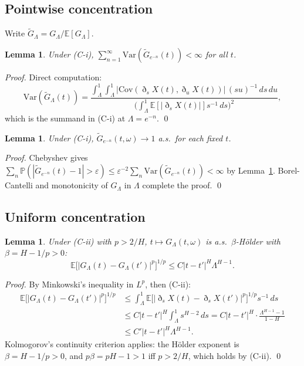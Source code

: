 \documentclass[10pt,a4paper]{amsart}
\newtheorem{lemma}[theorem]{Lemma}
\newcommand{\E}{\mathbb{E}}
\newcommand{\GL}{G_\Lambda}
\newcommand{\Gtil}{\tilde{G}_\Lambda}
\begin{document}
\subsection{Pointwise concentration}

Write $\Gtil=\GL/\E[\GL]$.

\begin{lemma}\label{lem:varsum}
Under (C-i), $\sum_{n=1}^\infty\mathrm{Var}(\tilde G_{e^{-n}}(t))<\infty$
for all $t$.
\end{lemma}

\begin{proof}
Direct computation:
\[
  \mathrm{Var}(\Gtil(t))
  = \frac{\int_\Lambda^1\!\int_\Lambda^1
    |\mathrm{Cov}(\eth_s X(t),\eth_u X(t))|\,(su)^{-1}\,ds\,du}
  {\bigl(\int_\Lambda^1\E[|\eth_s X(t)|]s^{-1}\,ds\bigr)^2},
\]
which is the summand in (C-i) at $\Lambda=e^{-n}$. \qed
\end{proof}

\begin{lemma}\label{lem:ptwise}
Under (C-i), $\tilde G_{e^{-n}}(t,\omega)\to1$ a.s.\ for each fixed $t$.
\end{lemma}

\begin{proof}
Chebyshev gives
$\sum_n\mathbb{P}(|\tilde G_{e^{-n}}(t)-1|>\varepsilon)
\le\varepsilon^{-2}\sum_n\mathrm{Var}(\tilde G_{e^{-n}}(t))<\infty$
by Lemma~\ref{lem:varsum}. Borel-Cantelli and monotonicity of $\GL$
in $\Lambda$ complete the proof. \qed
\end{proof}

\subsection{Uniform concentration}

\begin{lemma}\label{lem:holder}
Under (C-ii) with $p>2/H$, $t\mapsto\GL(t,\omega)$ is a.s.\
$\beta$-H\"{o}lder with $\beta=H-1/p>0$:
\[
  \E\bigl[|\GL(t)-\GL(t')|^p\bigr]^{1/p}
  \le C|t-t'|^H\Lambda^{H-1}.
\]
\end{lemma}

\begin{proof}
By Minkowski's inequality in $L^p$, then (C-ii):
\begin{align*}
  \E\bigl[|\GL(t)-\GL(t')|^p\bigr]^{1/p}
  &\le\int_\Lambda^1\E\bigl[|\eth_s X(t)-\eth_s X(t')|^p\bigr]^{1/p}
    s^{-1}\,ds\\
  &\le C|t-t'|^H\int_\Lambda^1 s^{H-2}\,ds
   = C|t-t'|^H\cdot\frac{\Lambda^{H-1}-1}{1-H}\\
  &\le C'|t-t'|^H\Lambda^{H-1}.
\end{align*}
Kolmogorov's continuity criterion applies: the H\"{o}lder exponent
is $\beta=H-1/p>0$, and $p\beta=pH-1>1$ iff $p>2/H$, which holds by
(C-ii). \qed
\end{proof}
\end{document}
